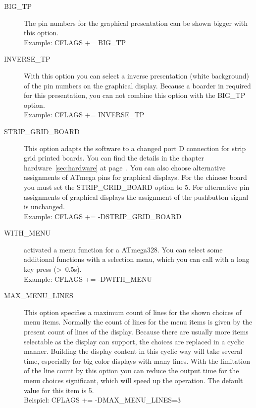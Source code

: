 \begin{description}
 \item[BIG\_TP] The pin numbers for the graphical presentation can be shown bigger with this option.\\
Example: CFLAGS += BIG\_TP

 \item[INVERSE\_TP] With this option you can select a inverse presentation (white background) of the pin numbers
on the graphical display.
Because a boarder in required for this presentation, you can not combine this option with the BIG\_TP option.\\
Example: CFLAGS += INVERSE\_TP

  \item[STRIP\_GRID\_BOARD] This option adapts the software to a changed port D connection for strip grid printed boards.
You can find the details in the chapter hardware~\ref{sec:hardware} at page~\pageref{sec:hardware}.
You can also choose alternative assignments of ATmega pins for graphical displays.
For the chinese  board you must set the STRIP\_GRID\_BOARD option to 5.
For alternative pin assignments of graphical displays the assignment of the pushbutton signal is unchanged.\\
Example: CFLAGS += -DSTRIP\_GRID\_BOARD

  \item[WITH\_MENU] activated a menu function for a ATmega328. You can select some additional functions with a
selection menu, which you can call with a long key press (\textgreater~0.5s).\\
Example: CFLAGS += -DWITH\_MENU

 \item[MAX\_MENU\_LINES]
This option specifies a maximum count of lines for the shown choices of menu items.
Normally the count of lines for the menu items is given by the present count of lines of the display.
Because there are usually more items selectable as the display can support,
the choices are replaced in a cyclic manner.
Building the display content in this cyclic way will take several time, especially for big color displays 
with many lines.
With the limitation of the line count by this option you can reduce the output time for the menu choices significant,
which will speed up the operation.
The default value for this item is 5.\\
Beispiel: CFLAGS += -DMAX\_MENU\_LINES=3



\end{description}
